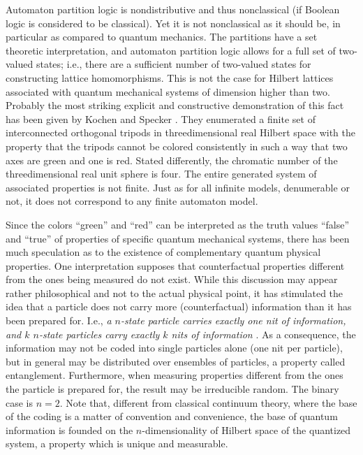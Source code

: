 \documentclass{llncs}
\begin{document}
Automaton partition logic is nondistributive and thus nonclassical (if Boolean logic is considered
to be classical).
Yet it is not nonclassical as it should be, in particular as compared to quantum mechanics.
The partitions have a set theoretic interpretation,
and automaton partition logic allows for a full set of two-valued states;
i.e., there are a sufficient number of two-valued states for constructing
lattice homomorphisms.
This is not the case for Hilbert lattices associated with quantum mechanical
systems of dimension higher than two.
Probably the most striking explicit and constructive demonstration of this fact
has been given by Kochen and Specker \cite{kochen1}.
They enumerated a finite set of interconnected orthogonal tripods
in threedimensional real Hilbert space
with the property that the tripods cannot be colored
consistently in such a way that two axes are green and one is red.
Stated differently, the chromatic number of the threedimensional real unit sphere is four.
The entire generated system of associated properties is not finite.
Just as for all infinite models, denumerable or not,
it does not correspond to any finite automaton model.

Since the colors ``green'' and ``red'' can be interpreted as the truth values
``false'' and ``true'' of properties of specific quantum mechanical systems,
there has been much speculation as to the existence of complementary quantum physical properties.
One interpretation supposes that counterfactual properties
different from the ones being measured do not exist.
While this discussion may appear rather philosophical and not to the actual physical point,
it has stimulated the idea that a particle does not carry more (counterfactual)
information than it has been prepared for.
I.e., {\em a $n$-state particle carries exactly one nit of information,
and $k$ $n$-state particles carry exactly $k$ nits of information}
\cite{zeil-99,DonSvo01,svozil-2002-statepart-prl}.
As a consequence, the information may not be coded into single particles alone (one nit per particle),
but in general may be distributed over ensembles of particles, a property called entanglement.
Furthermore, when measuring properties different from the ones the particle is
prepared for, the result may be irreducible random.
The binary case is $n=2$. Note that, different from classical continuum theory,
where the base of the coding is a matter
of convention and convenience, the base of quantum information
is founded on the $n$-dimensionality of Hilbert space of the quantized system,
a property which is unique and measurable.
\end{document}
